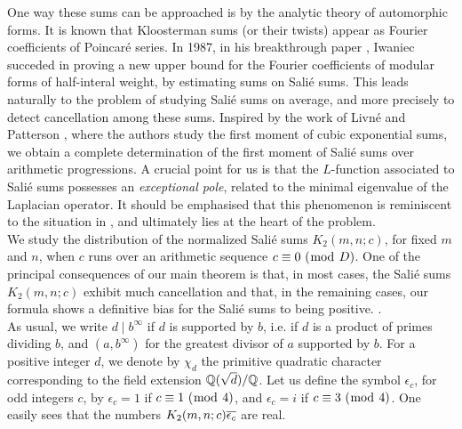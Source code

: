 \documentclass[leqno,10pt]{amsart}
\theoremstyle{plain}
\numberwithin{equation}{section}
\theoremstyle{definition}
\theoremstyle{remark}
\begin{document}
One way these sums can be approached is by the analytic theory of automorphic forms. It is known that Kloosterman sums (or their twists) appear as Fourier coefficients of Poincar\'e series. In 1987, in his breakthrough paper \cite{iwa:fourier-coeff}, Iwaniec succeded in proving a new upper bound for the Fourier coefficients of modular forms of half-interal weight, by estimating sums on Sali\'e sums. This leads naturally to the problem of studying Sali\'e sums on average, and more precisely to detect cancellation among these sums. Inspired by the work of Livn\'e and Patterson \cite{liv-pat}, where the authors study the first moment of cubic exponential sums, we obtain a complete determination of the first moment of Sali\'e sums over arithmetic progressions. A crucial point for us is that the $L$-function associated to Sali\'e sums possesses an {\it exceptional pole}, related to the minimal eigenvalue of the Laplacian operator. It should be emphasised that this phenomenon is reminiscent to the situation in \cite{liv-pat}, and ultimately lies at the heart of the problem. \\

We study the distribution of the normalized Sali\'e sums $K_2(m,n;c)$, for fixed $m$ and $n$, when $c$ runs over an arithmetic sequence $c\equiv 0 \ (\bmod\  D)$. One of the principal consequences of our main theorem is that, in most cases, the Sali\'e sums $K_2(m,n;c)$ exhibit much cancellation and that, in the remaining cases, our formula shows a definitive bias for the Sali\'e sums to being positive. . \\
 
As usual, we write $d \mid b^\infty$ if $d$ is supported by $b$, i.e. if $d$ is a product of primes dividing $b$, and $(a,b^\infty)$ for the greatest divisor of $a$ supported by $b$. For a positive integer $d$, we denote by $\chi_d$ the primitive quadratic character corresponding to the field extension $\mathbb{Q}(\sqrt{d})/\mathbb{Q}$. 
Let us define the symbol $\epsilon_c$, for odd integers $c$, by $\epsilon_c=1$ if $c\equiv 1 \ (\bmod\  4)$, and $\epsilon_c=i$ if $c\equiv 3 \ (\bmod\  4)$. One easily sees that the numbers $K_2(m,n;c) \overline{\epsilon_c}$ are real.
 
\end{document}
